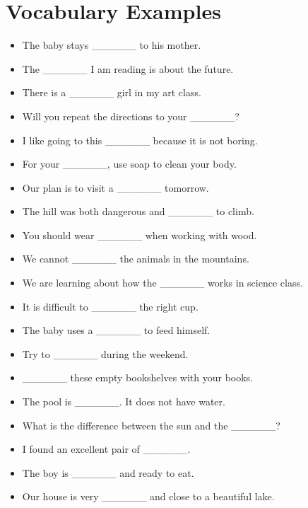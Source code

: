 \documentclass{article}
\begin{document}
\renewcommand{\familydefault}{\sfdefault}
\onehalfspacing
\fontsize{12pt}{14pt}\selectfont

\section*{Vocabulary Examples}
\begin{addmargin}[1em]{1em}
\begin{itemize}
    \item The baby stays \_\_\_\_\_\_ to his mother.
    \item The \_\_\_\_\_\_ I am reading is about the future.
    \item There is a \_\_\_\_\_\_ girl in my art class.
    \item Will you repeat the directions to your \_\_\_\_\_\_?
    \item I like going to this \_\_\_\_\_\_ because it is not boring.
    \item For your \_\_\_\_\_\_, use soap to clean your body.
    \item Our plan is to visit a \_\_\_\_\_\_ tomorrow.
    \item The hill was both dangerous and \_\_\_\_\_\_ to climb.
    \item You should wear \_\_\_\_\_\_ when working with wood.
    \item We cannot \_\_\_\_\_\_ the animals in the mountains.
    \item We are learning about how the \_\_\_\_\_\_ works in science class.
    \item It is difficult to \_\_\_\_\_\_ the right cup.
    \item The baby uses a \_\_\_\_\_\_ to feed himself.
    \item Try to \_\_\_\_\_\_ during the weekend.
    \item \_\_\_\_\_\_ these empty bookshelves with your books.
    \item The pool is \_\_\_\_\_\_. It does not have water.
    \item What is the difference between the sun and the \_\_\_\_\_\_?
    \item I found an excellent pair of \_\_\_\_\_\_.
    \item The boy is \_\_\_\_\_\_ and ready to eat.
    \item Our house is very \_\_\_\_\_\_ and close to a beautiful lake.
\end{itemize}
\end{addmargin}
\newpage
\end{document}
